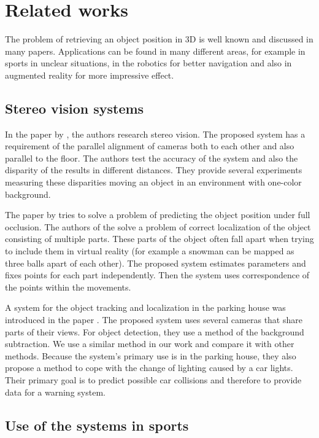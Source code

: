\chapter{Related works} 

The problem of retrieving an object position in 3D is well known and discussed
in many papers. Applications can be found in many different areas, for example in
sports in unclear situations, in the robotics for better navigation and
also in augmented reality for more impressive effect.

\section{Stereo vision systems}

In the paper by \citet*{zheng2010study}, the authors research stereo vision. The
proposed system has a requirement of the parallel alignment of cameras both to
each other and also parallel to the floor. The authors test the accuracy of the
system and also the disparity of the results in different distances. They
provide several experiments measuring these disparities moving an object in an
environment with one-color background.

The paper by \citet*{black2002multi} tries to solve a problem of predicting
the object position under full occlusion. The authors of the
\citet*{yonemoto1998tracking} solve a problem of correct localization of the
object consisting of multiple parts. These parts of the object often fall apart
when trying to include them in virtual reality (for example a snowman can be
mapped as three balls apart of each other). The proposed system estimates
parameters and fixes points for each part independently. Then the system uses
correspondence of the points within the movements.

A system for the object tracking and localization in the parking house was
introduced in the paper \citet*{ibisch2015arbitrary}. The proposed system uses
several cameras that share parts of their views. For object detection, they use a
method of the background subtraction. We use a similar method in our work and
compare it with other methods. Because the system's primary use is in the
parking house, they also propose a method to cope with the change of lighting
caused by a car lights. Their primary goal is to predict possible car collisions
and therefore to provide data for a warning system.

\section{Use of the systems in sports}

